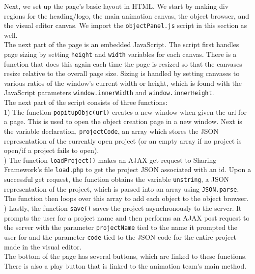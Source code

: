 \documentclass[12pt]{article}
\begin{document}
Next, we set up the page's basic layout in HTML. We start by making div regions for the heading/logo, the main animation canvas, the object browser, and the visual editor canvas. We import the \texttt{objectPanel.js} script in this section as well. \\

The next part of the page is an embedded JavaScript. The script first handles page sizing by setting \texttt{height} and \texttt{width} variables for each canvas. There is a function that does this again each time the page is resized so that the canvases resize relative to the overall page size. Sizing is handled by setting canvases to various ratios of the window's current width or height, which is found with the JavaScript parameters \texttt{window.innerWidth} and \texttt{window.innerHeight}. \\

The next part of the script consists of three functions: \\

1) The function \texttt{popitupObjc(url)} creates a new window when given the url for a page. This is used to open the object creation page in a new window. Next is the variable declaration, \texttt{projectCode}, an array which stores the JSON representation of the currently open project (or an empty array if no project is open/if a project fails to open). \\
) The function \texttt{loadProject()} makes an AJAX get request to Sharing Framework's file \texttt{load.php} to get the project JSON associated with an id. Upon a successful get request, the function obtains the variable \texttt{unstring}, a JSON representation of the project, which is parsed into an array using \texttt{JSON.parse}. The function then loops over this array to add each object to the object browser. \\
) Lastly, the function \texttt{save()} saves the project asynchronously to the server. It prompts the user for a project name and then performs an AJAX post request to the server with the parameter \texttt{projectName} tied to the name it prompted the user for and the parameter \texttt{code} tied to the JSON code for the entire project made in the visual editor. \\

The bottom of the page has several buttons, which are linked to these functions. There is also a play button that is linked to the animation team's main method. \\
\end{document}
